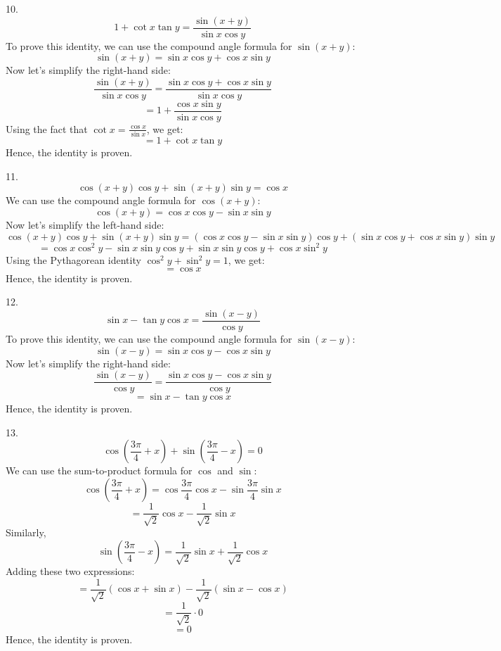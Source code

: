 \documentclass{article}
\begin{document}
10. $$1 + \cot x \tan y = \frac{\sin (x+y)}{\sin x \cos y}$$
    To prove this identity, we can use the compound angle formula for \(\sin (x+y)\):
    \[\sin (x+y) = \sin x \cos y + \cos x \sin y\]
    Now let's simplify the right-hand side:
    \[\frac{\sin (x+y)}{\sin x \cos y} = \frac{\sin x \cos y + \cos x \sin y}{\sin x \cos y}\]
    \[= 1 + \frac{\cos x \sin y}{\sin x \cos y}\]
    Using the fact that \(\cot x = \frac{\cos x}{\sin x}\), we get:
    \[= 1 + \cot x \tan y\]
    Hence, the identity is proven.
    
\vspace{2em}
11. $$\cos (x+y) \cos y + \sin (x+y) \sin y = \cos x$$
    We can use the compound angle formula for \(\cos (x+y)\):
    \[\cos (x+y) = \cos x \cos y - \sin x \sin y\]
    Now let's simplify the left-hand side:
    \[\cos (x+y) \cos y + \sin (x+y) \sin y = (\cos x \cos y - \sin x \sin y) \cos y + (\sin x \cos y + \cos x \sin y) \sin y\]
    \[= \cos x \cos^2 y - \sin x \sin y \cos y + \sin x \sin y \cos y + \cos x \sin^2 y\]
    Using the Pythagorean identity \(\cos^2 y + \sin^2 y = 1\), we get:
    \[= \cos x\]
    Hence, the identity is proven.

\vspace{2em}
12. $$\sin x - \tan y \cos x = \frac{\sin (x-y)}{\cos y}$$
    To prove this identity, we can use the compound angle formula for \(\sin (x-y)\):
    \[\sin (x-y) = \sin x \cos y - \cos x \sin y\]
    Now let's simplify the right-hand side:
    \[\frac{\sin (x-y)}{\cos y} = \frac{\sin x \cos y - \cos x \sin y}{\cos y}\]
    \[= \sin x - \tan y \cos x\]
    Hence, the identity is proven.

\vspace{2em}
13. $$\cos \left(\frac{3 \pi}{4} + x\right) + \sin \left(\frac{3 \pi}{4} - x\right) = 0$$
    We can use the sum-to-product formula for \(\cos\) and \(\sin\):
    \[\cos \left(\frac{3 \pi}{4} + x\right) = \cos \frac{3 \pi}{4} \cos x - \sin \frac{3 \pi}{4} \sin x\]
    \[= \frac{1}{\sqrt{2}} \cos x - \frac{1}{\sqrt{2}} \sin x\]
    Similarly,
    \[\sin \left(\frac{3 \pi}{4} - x\right) = \frac{1}{\sqrt{2}} \sin x + \frac{1}{\sqrt{2}} \cos x\]
    Adding these two expressions:
    \[= \frac{1}{\sqrt{2}} (\cos x + \sin x) - \frac{1}{\sqrt{2}} (\sin x - \cos x)\]
    \[= \frac{1}{\sqrt{2}} \cdot 0\]
    \[= 0\]
    Hence, the identity is proven.
\end{document}
